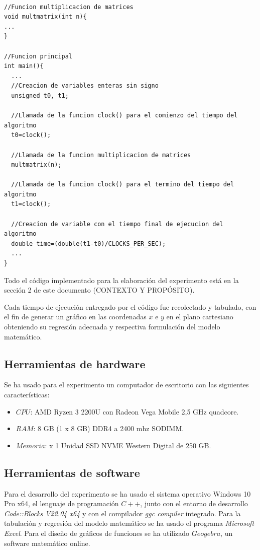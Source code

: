 \documentclass[11pt, twocolumn]{llncs}
\begin{document}
\lstset{language=, breaklines=true, basicstyle=\footnotesize}
\begin{lstlisting}[frame=single]

//Funcion multiplicacion de matrices
void multmatrix(int n){
...
}

//Funcion principal
int main(){
  ...
  //Creacion de variables enteras sin signo
  unsigned t0, t1;
  
  //Llamada de la funcion clock() para el comienzo del tiempo del algoritmo
  t0=clock();
  
  //Llamada de la funcion multiplicacion de matrices
  multmatrix(n);
  
  //Llamada de la funcion clock() para el termino del tiempo del algoritmo
  t1=clock();
  
  //Creacion de variable con el tiempo final de ejecucion del algoritmo
  double time=(double(t1-t0)/CLOCKS_PER_SEC);
  ...
}

\end{lstlisting}

Todo el código implementado para la elaboración del experimento está en la sección 2 de este documento (CONTEXTO Y PROPÓSITO).

Cada tiempo de ejecución entregado por el código fue recolectado y tabulado, con el fin de generar un gráfico en las coordenadas $x$ e $y$ en el plano cartesiano obteniendo su regresión adecuada y respectiva formulación del modelo matemático.

\subsection{Herramientas de hardware}
Se ha usado para el experimento un computador de escritorio con las siguientes características:

\begin{itemize}
    \item $CPU$: AMD Ryzen 3 2200U con Radeon Vega Mobile 2,5 GHz quadcore.
    \item $RAM$: 8 GB (1 x 8 GB) DDR4 a 2400 mhz SODIMM.
    \item $Memoria$: x 1 Unidad SSD NVME Western Digital de 250 GB.
\end{itemize}

\subsection{Herramientas de software}
Para el desarrollo del experimento se ha usado el sistema operativo Windows 10 Pro x64, el lenguaje de programación $C++$, junto con el entorno de desarrollo \textit{Code::Blocks V22.04 x64} y con el compilador \textit{ggc compiler} integrado. Para la tabulación y regresión del modelo matemático se ha usado el programa \textit{Microsoft Excel}. Para el diseño de gráficos de funciones se ha utilizado $Geogebra$, un software matemático online.
\end{document}
